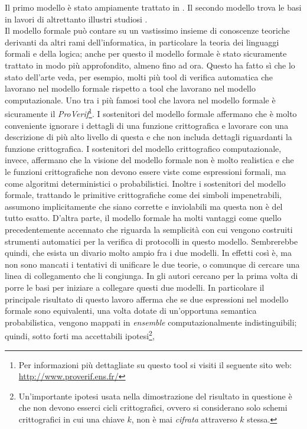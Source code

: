 \documentclass[a4paper,openright,twoside,12pt]{report}
\begin{document}
Il primo modello \`e stato ampiamente trattato in \cite{AbadiG99, BurrowsAN90, Kemmerer87, Paulson98}. 
Il secondo modello trova le basi in lavori di altrettanto illustri studiosi \cite{?}.\\
Il modello formale pu\`o contare su un vastissimo insieme di conoscenze teoriche derivanti da altri rami dell'informatica, in particolare la teoria dei linguaggi formali e della logica;
anche per questo il modello formale \`e stato sicuramente trattato in modo pi\`u approfondito, almeno fino ad ora. Questo ha fatto s\`i che lo stato dell'arte veda, per esempio, molti pi\`u tool di
verifica automatica che lavorano nel modello formale rispetto a tool che lavorano nel modello computazionale. 
Uno tra i pi\`u famosi tool che lavora nel modello formale \`e sicuramente il \emph{ProVerif}\footnote{Per informazioni pi\`u dettagliate su questo tool si visiti il seguente sito web: 
\url{http://www.proverif.ens.fr/}}.
I sostenitori del modello formale affermano che \`e molto conveniente ignorare i dettagli di una funzione crittografica e lavorare con una descrizione 
di pi\`u alto livello di questa e che non includa dettagli riguardanti la funzione crittografica. I sostenitori del modello crittografico computazionale, invece, affermano che la visione
del modello formale non \`e molto realistica e che le funzioni crittografiche non devono essere viste come espressioni formali, ma come algoritmi deterministici o probabilistici. Inoltre i
sostenitori del modello formale, trattando le primitive crittografiche come dei simboli impenetrabili, assumono implicitamente che siano corrette e inviolabili ma questa non \`e
del tutto esatto. D'altra parte, il modello formale ha molti vantaggi come quello precedentemente accennato che riguarda la semplicit\`a con cui vengono costruiti strumenti automatici per la verifica di protocolli in questo modello.
Sembrerebbe quindi, che esista un divario molto ampio fra i due modelli. In effetti cos\`i \`e, ma non sono mancati i tentativi di unificare le due teorie, o comunque di cercare una linea
di collegamento che li congiunga.
In \cite{DBLP:journals/joc/AbadiR07} gli autori cercano per la prima volta di porre le basi per iniziare a collegare questi due modelli.
In particolare il principale risultato di questo lavoro afferma che se due espressioni nel modello formale sono equivalenti, una volta dotate di un'opportuna semantica probabilistica,
vengono mappati in \emph{ensemble} computazionalmente indistinguibili; quindi, sotto forti ma accettabili ipotesi\footnote{Un'importante ipotesi usata nella dimostrazione del risultato in questione
\`e che non devono esserci cicli crittografici, ovvero si considerano solo schemi crittografici in cui una chiave $k$, non \`e mai \emph{cifrata} attraverso $k$ stessa.}, 
\end{document}
